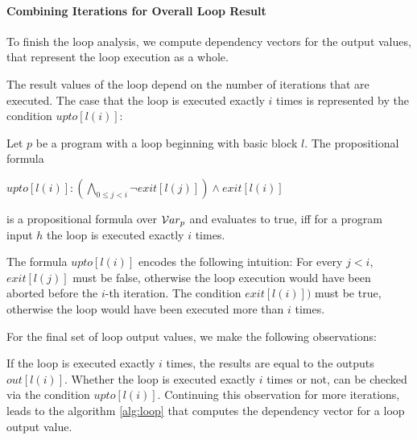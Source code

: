 \paragraph{Combining Iterations for Overall Loop Result}
To finish the loop analysis, we compute dependency vectors for the output values, that represent the loop execution as a whole.

The result values of the loop depend on the number of iterations that are executed. The case that the loop is executed exactly $i$ times is represented by the condition $upto[l(i)]$:

\begin{definition}
    Let $p$ be a program with a loop beginning with basic block $l$.
    The propositional formula
    \begin{center}
        $upto[l(i)]: (\bigwedge\limits_{0 \leq j < i} \lnot exit[l(j)]) \land exit[l(i)]$
    \end{center}
    is a propositional formula over $\mathcal{V}ar_p$ and evaluates to true, iff for a program input $h$ the loop is executed exactly $i$ times.
\end{definition}

The formula $upto[l(i)]$ encodes the following intuition: For every $j < i$, $exit[l(j)]$ must be false, otherwise the loop execution would have been aborted before the $i$-th iteration. The condition $exit[l(i)])$ must be true, otherwise the loop would have been executed more than $i$ times.

For the final set of loop output values, we make the following observations:

If the loop is executed exactly $i$ times, the results are equal to the outputs $out[l(i)]$. Whether the loop is executed exactly $i$ times or not, can be checked via the condition $upto[l(i)]$. Continuing this observation for more iterations, leads to the algorithm \ref{alg:loop} that computes the dependency vector for a loop output value.

